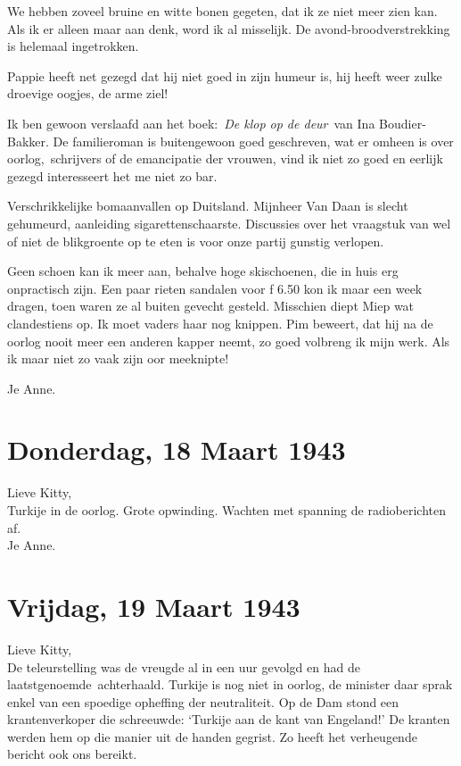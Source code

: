 \documentclass{book}
\begin{document}
We hebben zoveel bruine en witte bonen gegeten, dat ik ze niet meer zien kan.
Als ik er alleen maar aan denk, word ik al misselijk. De avond-broodverstrekking
is helemaal ingetrokken.

Pappie heeft net gezegd dat hij niet goed in zijn humeur is, hij heeft weer
zulke droevige oogjes, de arme ziel!

Ik ben gewoon verslaafd aan het boek:~\emph{De klop op de deur}~van Ina
Boudier-Bakker. De familieroman is buitengewoon goed geschreven, wat er omheen
is over oorlog,~schrijvers of de emancipatie der vrouwen, vind ik niet zo goed
en eerlijk gezegd interesseert het me niet zo bar.

Verschrikkelijke bomaanvallen op Duitsland. Mijnheer Van Daan is slecht
gehumeurd, aanleiding sigarettenschaarste. Discussies over het vraagstuk van wel
of niet de blikgroente op te eten is voor onze partij gunstig verlopen.

Geen schoen kan ik meer aan, behalve hoge skischoenen, die in huis erg
onpractisch zijn. Een paar rieten sandalen voor ƒ 6.50 kon ik maar een week
dragen, toen waren ze al buiten gevecht gesteld. Misschien diept Miep wat
clandestiens op. Ik moet vaders haar nog knippen. Pim beweert, dat hij na de
oorlog nooit meer een anderen kapper neemt, zo goed volbreng ik mijn werk. Als
ik maar niet zo vaak zijn oor meeknipte!

Je Anne.

\section*{Donderdag, 18 Maart 1943}

Lieve Kitty,\\
Turkije in de oorlog. Grote opwinding. Wachten met spanning de
radioberichten af.\\
Je Anne.

\section*{Vrijdag, 19 Maart 1943}

Lieve Kitty,\\
De teleurstelling was de vreugde al in een uur gevolgd en had de
laatstgenoemde~achterhaald. Turkije is nog niet in oorlog, de minister daar
sprak enkel van een spoedige opheffing der neutraliteit. Op de Dam stond een
krantenverkoper die schreeuwde: `Turkije aan de kant van Engeland!' De kranten
werden hem op die manier uit de handen gegrist. Zo heeft het verheugende bericht
ook ons bereikt.
\end{document}
